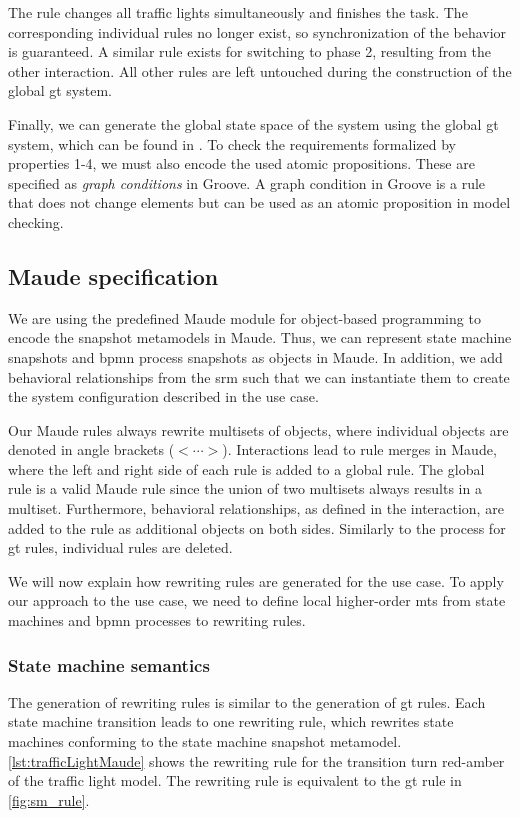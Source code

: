 \documentclass{jot}
\begin{document}
The rule changes all traffic lights simultaneously and finishes the task.
The corresponding individual rules no longer exist, so synchronization of the behavior is guaranteed.
A similar rule exists for switching to phase 2, resulting from the other interaction.
All other rules are left untouched during the construction of the global \gls*{gt} system.

Finally, we can generate the global state space of the system using the global \gls*{gt} system, which can be found in \cite{krauterArtifactsBehavioralConsistency2022}.
To check the requirements formalized by properties 1-4, we must also encode the used atomic propositions.
These are specified as \emph{graph conditions} in Groove.
A graph condition in Groove is a rule that does not change elements but can be used as an atomic proposition in model checking.


\subsection{Maude specification}
We are using the predefined Maude module for object-based programming to encode the snapshot metamodels in Maude.
Thus, we can represent state machine snapshots and \gls*{bpmn} process snapshots as objects in Maude.
In addition, we add behavioral relationships from the \gls*{srm} such that we can instantiate them to create the system configuration described in the use case.

Our Maude rules always rewrite multisets of objects, where individual objects are denoted in angle brackets ($<\cdots>$).
Interactions lead to rule merges in Maude, where the left and right side of each rule is added to a global rule.
The global rule is a valid Maude rule since the union of two multisets always results in a multiset. 
Furthermore, behavioral relationships, as defined in the interaction, are added to the rule as additional objects on both sides.
Similarly to the process for \gls*{gt} rules, individual rules are deleted.

We will now explain how rewriting rules are generated for the use case.
To apply our approach to the use case, we need to define local higher-order \gls*{mt}s from state machines and \gls*{bpmn} processes to rewriting rules.


\subsubsection{State machine semantics}
The generation of rewriting rules is similar to the generation of \gls*{gt} rules.
Each state machine transition leads to one rewriting rule, which rewrites state machines conforming to the state machine snapshot metamodel.
\autoref{lst:trafficLightMaude} shows the rewriting rule for the transition \textsf{turn red-amber} of the traffic light model.
The rewriting rule is equivalent to the \gls*{gt} rule in \cref{fig:sm_rule}.
\end{document}
